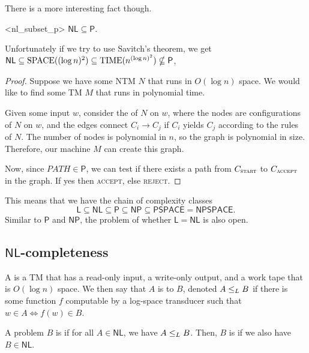 \documentclass{standalone}
\begin{document}
There is a more interesting fact though.
\begin{proposition}<nl_subset_p>
	\(\mathsf{NL} \subseteq \mathsf{P}\).
\end{proposition}
Unfortunately if we try to use Savitch's theorem, we get \(\mathsf{NL} \subseteq \operatorname{SPACE}((\log n)^2) \subseteq \operatorname{TIME}(n^{(\log n)^2}) \nsubseteq \mathsf{P}\),
\begin{proof}
	Suppose we have some \textsf{NTM} \(N\) that runs in \(O(\log n)\) space. We would like to find some \textsf{TM} \(M\) that runs in polynomial time.

	Given some input \(w\), consider the  of \(N\) on \(w\), where the nodes are configurations of \(N\) on \(w\), and the edges connect \(C_i \to C_j\) if \(C_i\) yields \(C_j\) according to the rules of \(N\). The number of nodes is polynomial in \(n\), so the graph is polynomial in size. Therefore, our machine \(M\) can create this graph.

	Now, since \(\textit{PATH} \in \mathsf{P}\), we can test if there exists a path from \(C_{\textsc{start}}\) to \(C_{\textsc{accept}}\) in the graph. If yes then \textsc{accept}, else \textsc{reject}.
\end{proof}

This means that we have the chain of complexity classes
\[
	\mathsf{L} \subseteq \mathsf{NL} \subseteq \mathsf{P} \subseteq \mathsf{NP} \subseteq \mathsf{PSPACE} = \mathsf{NPSPACE}.
\]
Similar to \(\mathsf{P}\) and \(\mathsf{NP}\), the problem of whether \(\mathsf L = \mathsf{NL}\) is also open.

\subsection{\texorpdfstring{\(\mathsf{NL}\)}{NL}-completeness}
\begin{definition}
	A  is a \textsf{TM} that has a read-only input, a write-only output, and a work tape that is \(O(\log n)\) space. We then say that \(A\) is  to \(B\), denoted \(A \mathrel{\leq_L} B\) if there is some function \(f\) computable by a log-space transducer such that \(w \in A \iff f(w) \in B\).
\end{definition}

\begin{definition}
	A problem \(B\) is  if for all \(A \in \mathsf{NL}\), we have \(A \mathrel{\leq_L} B\). Then, \(B\) is  if we also have \(B \in \mathsf{NL}\).
\end{definition}
\end{document}
